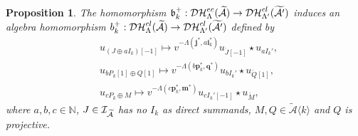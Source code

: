 \documentclass[reqno,12pt]{amsart}
\numberwithin{equation}{section}
\theoremstyle{plain} %
\newtheorem{proposition}[theorem]{\bf Proposition}
\theoremstyle{definition} %
\begin{document}
\begin{proposition}
The homomorphism  $\mathfrak{b}_k^+:\mathcal{DH}_{\Lambda}^{ec}(\widetilde{\mathcal{A}})\to \mathcal{DH}_{\Lambda'}^{cl}(\widetilde{\mathcal{A}'})$ induces an algebra homomorphism
$b_k^+:\mathcal{DH}_{\Lambda}^{cl}(\widetilde{\mathcal{A}})\to \mathcal{DH}_{\Lambda'}^{cl}(\widetilde{\mathcal{A}'})$ defined by
\begin{align*}
&u_{(J\oplus aI_k)[-1]}\mapsto v^{-\Lambda(\mathbf{j}^\ast,a\mathbf{i}_k^\ast)}u_{\acute{J}[-1]}\star u_{aI_k'},\\
&u_{bP_k[1]\oplus Q[1]}\mapsto v^{-\Lambda(b\mathbf{p}_k^\ast, \mathbf{q}^\ast)}u_{bI_k'}\star u_{\acute{Q}[1]},\\
&u_{cP_k\oplus M}\mapsto v^{-\Lambda(c{\mathbf{p}_k^\ast},\mathbf{m}^\ast)}u_{cI_k'[-1]}\star u_{\acute{M}},
\end{align*}
where $a,b,c\in \mathbb{N}$, $J\in \mathcal{I}_{\widetilde{\mathcal{A}}}$ has no $I_k$ as direct summands,
$M, Q\in \widetilde{\mathcal{A}}\langle k\rangle$ and $Q$ is projective.
\end{proposition}
\end{document}
